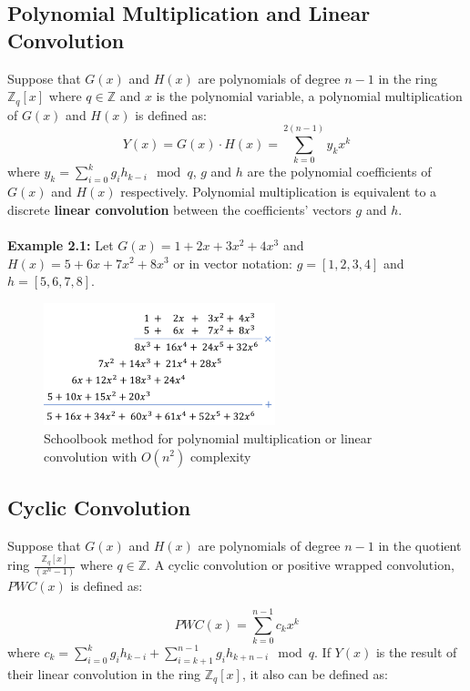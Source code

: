 \documentclass[12pt]{report}
\begin{document}
\subsection{Polynomial Multiplication and Linear Convolution}
Suppose that $G(x)$ and $H(x)$ are polynomials of degree $n-1$ in the ring $\mathbb{Z}_q[x]$ where $q \in \mathbb{Z}$ and $x$ is the polynomial variable, a polynomial multiplication of $G(x)$ and $H(x)$ is defined as:
\[Y(x)=G(x)\cdot H(x)=\sum_{k=0}^{2(n-1)}y_{k}x^{k}\]
where $y_{k}=\sum_{i=0}^{k}g_{i}h_{k-i} \mod q$, $g$ and $h$ are the polynomial coefficients of $G(x)$ and $H(x)$ respectively. Polynomial multiplication is equivalent to a discrete \textbf{linear convolution} between the coefficients' vectors $g$ and $h$.\\ \\
\textbf{Example 2.1:} Let $G(x)=1+2x+3x^{2}+4x^{3}$ and $H(x)=5+6x+7x^{2}+8x^{3}$ or in vector notation: $g=[1,2,3,4]$ and $h=[5,6,7,8]$.

\begin{figure}[H]
    \centering
    \includegraphics[width=0.6\textwidth]{./ntt_figures/1.png}
    \caption{Schoolbook method for polynomial multiplication or linear convolution with $O(n^2)$ complexity}
\end{figure}

\subsection{Cyclic Convolution}
Suppose that $G(x)$ and $H(x)$ are polynomials of degree $n-1$ in the quotient ring $\frac{\mathbb{Z}_{q}[x]}{(x^{n}-1)}$ where $q \in \mathbb{Z}$. A cyclic convolution or positive wrapped convolution, $PWC(x)$ is defined as:

\[PWC(x) = \sum_{k=0}^{n-1} c_k x^k\]
where $c_{k}=\sum_{i=0}^{k}g_{i}h_{k-i}+\sum_{i=k+1}^{n-1}g_{i}h_{k+n-i} \mod q$. If $Y(x)$ is the result of their linear convolution in the ring $\mathbb{Z}_{q}[x]$, it also can be defined as:
\end{document}

